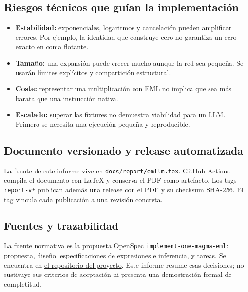 \documentclass[11pt,a4paper]{article}
\begin{document}
\subsection{Riesgos técnicos que guían la implementación}
\begin{itemize}
\item \textbf{Estabilidad:} exponenciales, logaritmos y cancelación pueden
      amplificar errores. Por ejemplo, la identidad que construye cero no
      garantiza un cero exacto en coma flotante.
\item \textbf{Tamaño:} una expansión puede crecer mucho aunque la red sea
      pequeña. Se usarán límites explícitos y compartición estructural.
\item \textbf{Coste:} representar una multiplicación con EML no implica
      que sea más barata que una instrucción nativa.
\item \textbf{Escalado:} superar las fixtures no demuestra viabilidad para
      un LLM. Primero se necesita una ejecución pequeña y reproducible.
\end{itemize}

\subsection{Documento versionado y release automatizada}
La fuente de este informe vive en \texttt{docs/report/emllm.tex}. GitHub
Actions compila el documento con LaTeX y conserva el PDF como artefacto.
Los tags \texttt{report-v*} publican además una release con el PDF y su
checksum SHA-256. El tag vincula cada publicación a una revisión concreta.

\begin{center}
\end{center}

\subsection{Fuentes y trazabilidad}
La fuente normativa es la propuesta OpenSpec
\texttt{implement-one-magma-eml}: propuesta, diseño, especificaciones de
expresiones e inferencia, y tareas. Se encuentra en
\href{https://github.com/SugarFreeDoNoSo/emllm/tree/main/openspec/changes/implement-one-magma-eml}{el repositorio del proyecto}.
Este informe resume esas decisiones; no sustituye sus criterios de aceptación
ni presenta una demostración formal de completitud.
\end{document}
